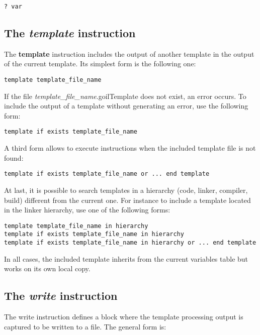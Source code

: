 \begin{lstlisting}
? var
\end{lstlisting}

\subsection{The {\em template} instruction}

The {\bf template} instruction includes the output of another template in the output of the current template. Its simplest form is the following one:

\begin{lstlisting}
template template_file_name
\end{lstlisting}

If the file {\em template\_file\_name}.goilTemplate does not exist, an error occurs. To include the output of a template without generating an error, use the following form:

\begin{lstlisting}
template if exists template_file_name
\end{lstlisting}

A third form allows to execute instructions when the included template file is not found:

\begin{lstlisting}
template if exists template_file_name or ... end template
\end{lstlisting}

At last, it is possible to search templates in a hierarchy (code, linker, compiler, build) different from the current one. For instance to include a template located in the linker hierarchy, use one of the following forms:

\begin{lstlisting}
template template_file_name in hierarchy
template if exists template_file_name in hierarchy
template if exists template_file_name in hierarchy or ... end template
\end{lstlisting}


In all cases, the included template inherits from the current variables table but works on its own local copy.

\subsection{The {\em write} instruction}

The write instruction defines a block where the template processing output is captured to be written to a file. The general form is:

